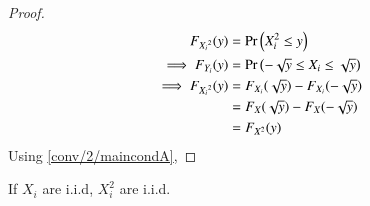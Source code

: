 \begin{proof}
\begin{align}
    F_{{X_i}^2}(y) &=\Pr\left(X_i^2 \leq y\right)
    \\
    \implies F_{Y_i}(y)&=\Pr\left(-\sqrt{y} \leq X_i \leq \sqrt{y}\right)\label{conv/2/eqref}\\
\implies   F_{{X_i}^2}(y)&=F_{X_i}(\sqrt{y})-F_{X_i}(-\sqrt{y})
\\
&= F_{X}(\sqrt{y})-F_{X}(-\sqrt{y}) 
\\
&= F_{{X}^2}(y)
\end{align}
Using \eqref{conv/2/maincondA},
\end{proof}
\begin{corollary} \label{conv/2/xi2lma}
    If $X_i$ are i.i.d, $X_i^2$ are i.i.d.
\end{corollary}
